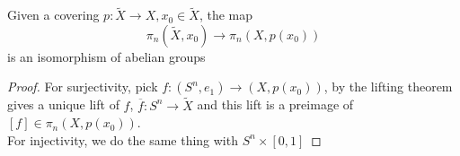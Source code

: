 \documentclass[../main.tex]{subfiles}
\begin{document}
\begin{lemma}
Given a covering $p: \tilde X \to X, x_0\in \tilde X$, the map 
\[ 
\pi_n ( \tilde X, x_0) \to \pi_n( X, p( x_0) ) 
\]
is an isomorphism of abelian groups
\end{lemma}
\begin{proof}
For surjectivity, pick $f: ( S^{n}, e_1) \to ( X, p( x_0) ) $, by the lifting theorem gives a unique lift of $f$, $\overline{f}: S^{n}\to \tilde X$ and this lift is a preimage of $ [ f] \in \pi_n( X, p( x_0) ) $.\\
For injectivity, we do the same thing with $S^{n}\times [ 0,1] $ 
\end{proof}
\end{document}
